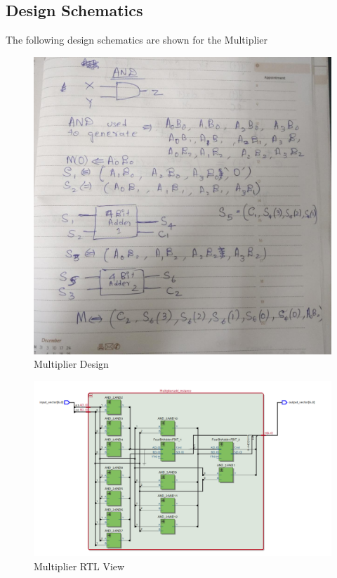 \documentclass[12pt]{article}
\begin{document}
\subsection{Design Schematics}
The following design schematics are shown for the Multiplier 

\begin{figure}[H]
\centering
  \includegraphics[scale=0.3]{Images/Multiplier_Design.jpeg}
  \caption{Multiplier Design}
\end{figure}

\begin{figure}[H]
\centering
  \includegraphics[scale=0.3]{Images/Multiplier_RTLViewer.png}
  \caption{Multiplier RTL View}
\end{figure}
\end{document}
